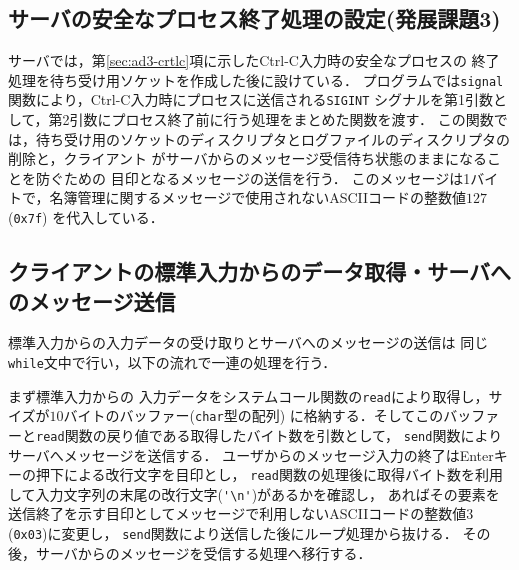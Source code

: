 \subsection{サーバの安全なプロセス終了処理の設定(発展課題3)} \label{sec:prog-ad3-original}
サーバでは，第\ref{sec:ad3-crtlc}項に示したCtrl-C入力時の安全なプロセスの
終了処理を待ち受け用ソケットを作成した後に設けている．
プログラムでは\verb|signal|関数により，Ctrl-C入力時にプロセスに送信される\verb|SIGINT|
シグナルを第1引数として，第2引数にプロセス終了前に行う処理をまとめた関数を渡す．
この関数では，待ち受け用のソケットのディスクリプタとログファイルのディスクリプタの削除と，クライアント
がサーバからのメッセージ受信待ち状態のままになることを防ぐための
目印となるメッセージの送信を行う．
このメッセージは1バイトで，名簿管理に関するメッセージで使用されないASCIIコードの整数値$127$(\verb|0x7f|)
を代入している．

\subsection{クライアントの標準入力からのデータ取得・サーバへのメッセージ送信} \label{sec:prog-client-send}
標準入力からの入力データの受け取りとサーバへのメッセージの送信は
同じ\verb|while|文中で行い，以下の流れで一連の処理を行う．

まず標準入力からの
入力データをシステムコール関数の\verb|read|により取得し，サイズが$10$バイトのバッファー(\verb|char|型の配列)
に格納する．そしてこのバッファーと\verb|read|関数の戻り値である取得したバイト数を引数として，
\verb|send|関数によりサーバへメッセージを送信する．
ユーザからのメッセージ入力の終了はEnterキーの押下による改行文字を目印とし，
\verb|read|関数の処理後に取得バイト数を利用して入力文字列の末尾の改行文字(\verb|'\n'|)があるかを確認し，
あればその要素を送信終了を示す目印としてメッセージで利用しないASCIIコードの整数値$3$(\verb|0x03|)に変更し，
\verb|send|関数により送信した後にループ処理から抜ける．
その後，サーバからのメッセージを受信する処理へ移行する．

